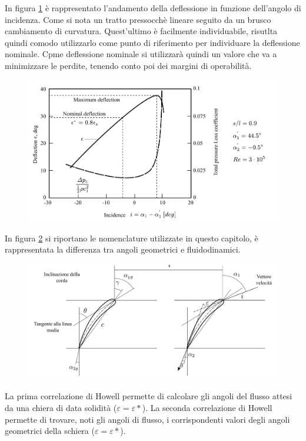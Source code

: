 In figura \ref{fig:Howell} è rappresentato l'andamento della deflessione in funzione dell'angolo di incidenza. Come si nota un tratto pressocchè lineare seguito da un brusco cambiamento di curvatura. Quest'ultimo è facilmente individuabile, risutlta quindi comodo utilizzarlo come punto di riferimento per individuare la deflessione nominale. Cpme deflessione nominale si utilizzarà quindi un valore che va a minimizzare le perdite, tenendo conto poi dei margini di operabilità.  
\begin{figure}
\centering
  \includegraphics[width=\textwidth]{fig/Howell.pdf}
\caption{}
\label{fig:Howell}
\end{figure}
In figura \ref{fig:SchieraDim} si riportano le nomenclature utilizzate in questo capitolo, è rappresentata la differenza tra angoli geometrici e fluidodinamici.
\begin{figure}
\centering
  \includegraphics[width=\textwidth]{fig/SchieraDim.pdf}
\caption{}
\label{fig:SchieraDim}
\end{figure}
La prima correlazione di Howell permette di calcolare gli angoli del flusso attesi da una chiera di data solidità ($\varepsilon = \varepsilon*$).
La seconda correlazione di Howell permette di trovare, noti gli angoli di flusso, i corrispondenti valori degli angoli geometrici della schiera ($\varepsilon = \varepsilon*$).
